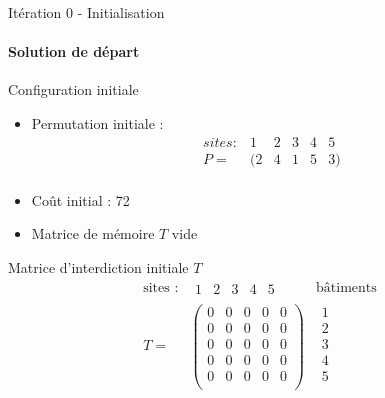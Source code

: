 \documentclass[10pt, handout]{beamer}
\begin{document}
\begin{frame}{Itération 0 - Initialisation}
    \framesubtitle{Solution de départ}

    \begin{block}{Configuration initiale}
        \begin{itemize}
            \item Permutation initiale :
                  \[
                      \begin{array}{cccccc}
                          sites : & 1  & 2 & 3 & 4 & 5  \\
                          P =     & (2 & 4 & 1 & 5 & 3) \\
                      \end{array}
                  \]

            \item Coût initial : 72
            \item Matrice de mémoire \( T \) vide
        \end{itemize}
    \end{block}

    \begin{exampleblock}{Matrice d'interdiction initiale \( T \)}
        \[
            \begin{array}{cc|c}
                
                \text{sites :} & 
                \begin{array}{ccccc}
                    1 & 2 & 3 & 4 & 5
                \end{array}
                               & \text{bâtiments} \\[1ex]
                T =            &
                \begin{pmatrix}
                    0 & 0 & 0 & 0 & 0 \\
                    0 & 0 & 0 & 0 & 0 \\
                    0 & 0 & 0 & 0 & 0 \\
                    0 & 0 & 0 & 0 & 0 \\
                    0 & 0 & 0 & 0 & 0 \\
                \end{pmatrix}
                               &
                \begin{array}{c}

                    1 \\
                    2 \\
                    3 \\
                    4 \\
                    5 \\
                \end{array}
            \end{array}
        \]
    \end{exampleblock}

\end{frame}
\end{document}

